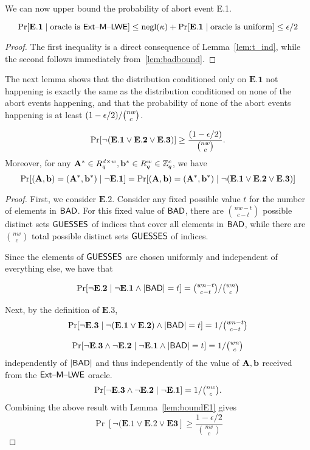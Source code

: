 We can now upper bound the probability of abort event E.1.
\begin{lemma}\label{lem:boundE1}
\[\Pr[\mathbf{E.1} \mid \text{oracle is }\mathsf{Ext \text{\textendash} M \text{\textendash} LWE}] \leq \operatorname{negl}(\kappa) + \Pr[\mathbf{E.1} \mid \text{oracle is uniform}] \leq \epsilon/2\]
\end{lemma}
\begin{proof}
The first inequality is a direct consequence of Lemma~\ref{lem:t_ind}, while the second follows immediately from~\ref{lem:badbound}.
\end{proof}


The next lemma shows that the distribution conditioned only on $\textbf{E.1}$ not happening is exactly the same as the distribution conditioned
on none of the abort events happening, and that the probability of none of the abort events happening is at least $(1-\epsilon/2)/\tbinom{nw}{c}$.

\begin{lemma}
\label{lem:abortequiv}
\[\Pr[\neg (\mathbf{E.1} \vee \mathbf{E.2} \vee \mathbf{E.3})] \geq \frac{(1-\epsilon/2)}{\tbinom{nw}{c}}.\]
Moreover, for any $\mathbf{A}^* \in R_q^{d \times w},\mathbf{b}^* \in R_q^w \in \mathbb{Z}_q^c$, we have 
\[\Pr[(\mathbf{A},\mathbf{b})=(\mathbf{A}^*,\mathbf{b}^*) \mid \neg \mathbf{E.1}] = \Pr[(\mathbf{A},\mathbf{b})=(\mathbf{A}^*,\mathbf{b}^*) \mid \neg (\mathbf{E.1} \vee \mathbf{E.2} \vee \mathbf{E.3})]  \]
\end{lemma}
\begin{proof}
  First, we consider $\mathbf{E.2}$. Consider any fixed possible value
  $t$ for the number of elements in $\textsf{BAD}$.  For this fixed value of $\textsf{BAD}$, there are
  $\binom{nw-t}{c-t}$ possible distinct sets $\textsf{GUESSES}$ of indices
  that cover all elements in $\textsf{BAD}$, while there are $\binom{nw}{c}$
  total possible distinct sets  $\textsf{GUESSES}$ of indices.

Since the elements of $\textsf{GUESSES}$ are chosen uniformly and
independent of everything else, we have that 

\[\Pr[\neg \mathbf{E.2} \mid  \neg \mathbf{E.1} \wedge \lvert\textsf{BAD}\rvert=t] =
\tbinom{wn-t}{c-t}/\tbinom{wn}{c}\]

Next, by the definition of $\mathbf{E.3}$,
\[\Pr[\neg \mathbf{E.3} \mid \neg (\mathbf{E.1} \vee \mathbf{E.2}) \wedge
  \lvert\textsf{BAD}\rvert=t] = 1/\tbinom{wn-t}{c-t}\]


\[\Pr[\neg \mathbf{E.3} \wedge \neg \mathbf{E.2} \mid \neg \mathbf{E.1} \wedge
\lvert\textsf{BAD}\rvert=t] = 1/\tbinom{wn}{c}\]
independently of $\lvert\textsf{BAD}\rvert$ and thus independently of the value of  $\mathbf{A}, \mathbf{b}$ received from the
$\mathsf{Ext \text{\textendash} M \text{\textendash} LWE}$ oracle. 
\[\Pr[\neg \mathbf{E.3} \wedge \neg \mathbf{E.2} \mid \neg \mathbf{E.1}] =
1/\tbinom{nw}{c}.\]
Combining the above result with Lemma~\ref{lem:boundE1} gives
\[\Pr[\neg (\mathbf{E.1} \vee \mathbf{E.2} \vee \mathbf{E3}] \geq
\frac{1-\epsilon/2}{\binom{nw}{c}}\]
\end{proof}

